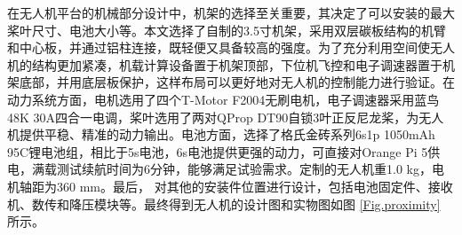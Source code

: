 \documentclass[lang=chs, degree=master, blindreview=false, winfonts=true]{yanputhesis}
\begin{document}

在无人机平台的机械部分设计中，机架的选择至关重要，其决定了可以安装的最大桨叶尺寸、电池大小等。本文选择了自制的3.5寸机架，采用双层碳板结构的机臂和中心板，并通过铝柱连接，既轻便又具备较高的强度。为了充分利用空间使无人机的结构更加紧凑，机载计算设备置于机架顶部，下位机飞控和电子调速器置于机架底部，并用底层板保护，这样布局可以更好地对无人机的控制能力进行验证。在动力系统方面，电机选用了四个T-Motor F2004无刷电机，电子调速器采用蓝鸟48K 30A四合一电调，桨叶选用了两对QProp DT90自锁3叶正反尼龙桨，为无人机提供平稳、精准的动力输出。电池方面，选择了格氏金砖系列6s1p 1050mAh 95C锂电池组，相比于5s电池，6s电池提供更强的动力，可直接对Orange Pi 5供电，满载测试续航时间为6分钟，能够满足试验需求。定制的无人机重1.0 kg，电机轴距为360 mm。最后， 对其他的安装件位置进行设计，包括电池固定件、接收机、数传和降压模块等。最终得到无人机的设计图和实物图如图 \ref{Fig.proximity} 所示。
\end{document}
